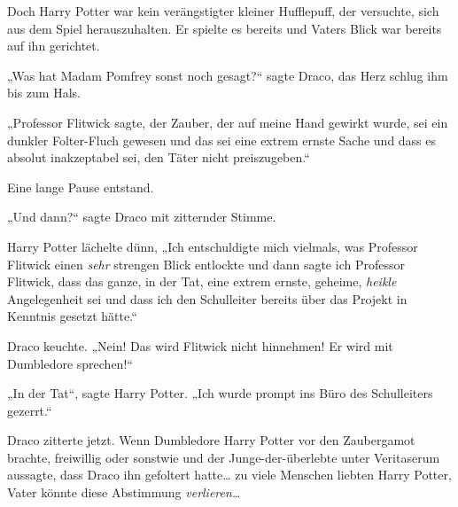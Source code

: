 Doch Harry Potter war kein verängstigter kleiner Hufflepuff, der versuchte, sich aus dem Spiel herauszuhalten. Er spielte es bereits und Vaters Blick war bereits auf ihn gerichtet.

„Was hat Madam Pomfrey sonst noch gesagt?“ sagte Draco, das Herz schlug ihm bis zum Hals.

„Professor Flitwick sagte, der Zauber, der auf meine Hand gewirkt wurde, sei ein dunkler Folter-Fluch gewesen und das sei eine extrem ernste Sache und dass es absolut inakzeptabel sei, den Täter nicht preiszugeben.“

Eine lange Pause entstand.

„Und dann?“ sagte Draco mit zitternder Stimme.

Harry Potter lächelte dünn, „Ich entschuldigte mich vielmals, was Professor Flitwick einen \emph{sehr} strengen Blick entlockte und dann sagte ich Professor Flitwick, dass das ganze, in der Tat, eine extrem ernste, geheime, \emph{heikle} Angelegenheit sei und dass ich den Schulleiter bereits über das Projekt in Kenntnis gesetzt hätte.“

Draco keuchte. „Nein! Das wird Flitwick nicht hinnehmen! Er wird mit Dumbledore sprechen!“

„In der Tat“, sagte Harry Potter. „Ich wurde prompt ins Büro des Schulleiters gezerrt.“

Draco zitterte jetzt. Wenn Dumbledore Harry Potter vor den Zaubergamot brachte, freiwillig oder sonstwie und der Junge-der-überlebte unter Veritaserum aussagte, dass Draco ihn gefoltert hatte… zu viele Menschen liebten Harry Potter, Vater könnte diese Abstimmung \emph{verlieren…}

